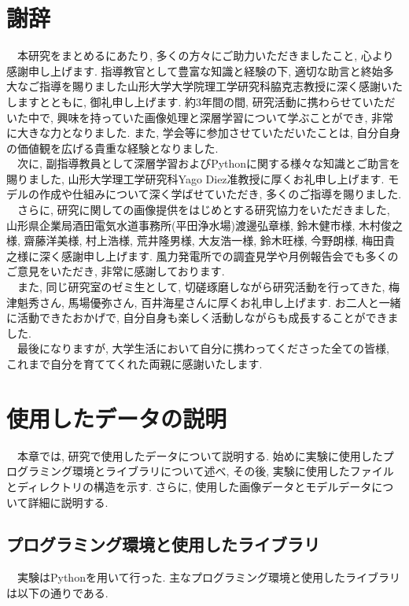 \documentclass[a4paper, 12pt]{report}
\begin{document}
\section{謝辞}
　本研究をまとめるにあたり, 多くの方々にご助力いただきましたこと, 心より感謝申し上げます. 指導教官として豊富な知識と経験の下, 適切な助言と終始多大なご指導を賜りました山形大学大学院理工学研究科脇克志教授に深く感謝いたしますとともに, 御礼申し上げます. 約3年間の間, 研究活動に携わらせていただいた中で, 興味を持っていた画像処理と深層学習について学ぶことができ, 非常に大きな力となりました. また, 学会等に参加させていただいたことは, 自分自身の価値観を広げる貴重な経験となりました. 
\\　次に, 副指導教員として深層学習およびPythonに関する様々な知識とご助言を賜りました, 山形大学理工学研究科Yago Diez准教授に厚くお礼申し上げます. モデルの作成や仕組みについて深く学ばせていただき, 多くのご指導を賜りました. 
\\　さらに, 研究に関しての画像提供をはじめとする研究協力をいただきました, 山形県企業局酒田電気水道事務所(平田浄水場)渡邊弘章様, 鈴木健市様, 木村俊之様, 齋藤洋美様, 村上浩様, 荒井隆男様, 大友浩一様, 鈴木旺様, 今野朗様, 梅田貴之様に深く感謝申し上げます. 風力発電所での調査見学や月例報告会でも多くのご意見をいただき, 非常に感謝しております. 
\\　また, 同じ研究室のゼミ生として, 切磋琢磨しながら研究活動を行ってきた, 梅津魁秀さん, 馬場優弥さん, 百井海星さんに厚くお礼申し上げます. お二人と一緒に活動できたおかげで, 自分自身も楽しく活動しながらも成長することができました. 
\\　最後になりますが, 大学生活において自分に携わってくださった全ての皆様, これまで自分を育ててくれた両親に感謝いたします. 

\section{使用したデータの説明}
　本章では, 研究で使用したデータについて説明する. 始めに実験に使用したプログラミング環境とライブラリについて述べ, その後, 実験に使用したファイルとディレクトリの構造を示す. さらに, 使用した画像データとモデルデータについて詳細に説明する. 

\subsection{プログラミング環境と使用したライブラリ}
　実験はPythonを用いて行った. 主なプログラミング環境と使用したライブラリは以下の通りである. 
\end{document}
